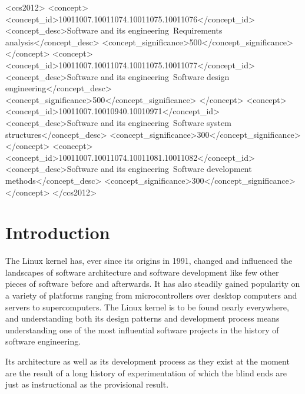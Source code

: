 \documentclass{sig-alternate-05-2015}
\begin{document}
%
 \begin{CCSXML}
<ccs2012>
<concept>
<concept_id>10011007.10011074.10011075.10011076</concept_id>
<concept_desc>Software and its engineering~Requirements analysis</concept_desc>
<concept_significance>500</concept_significance>
</concept>
<concept>
<concept_id>10011007.10011074.10011075.10011077</concept_id>
<concept_desc>Software and its engineering~Software design engineering</concept_desc>
<concept_significance>500</concept_significance>
</concept>
<concept>
<concept_id>10011007.10010940.10010971</concept_id>
<concept_desc>Software and its engineering~Software system structures</concept_desc>
<concept_significance>300</concept_significance>
</concept>
<concept>
<concept_id>10011007.10011074.10011081.10011082</concept_id>
<concept_desc>Software and its engineering~Software development methods</concept_desc>
<concept_significance>300</concept_significance>
</concept>
</ccs2012>
\end{CCSXML}



\printccsdesc{}


\section{Introduction}

The Linux kernel has, ever since its origins in 1991, changed and influenced the landscapes of software architecture and software development like few other pieces of software before and afterwards.
It has also steadily gained popularity on a variety of platforms ranging from microcontrollers over desktop computers and servers to supercomputers.
The Linux kernel is to be found nearly everywhere, and understanding both its design patterns and development process means understanding one of the most influential software projects in the history of software engineering.

Its architecture as well as its development process as they exist at the moment are the result of a long history of experimentation of which the blind ends are just as instructional as the provisional result.
\end{document}
